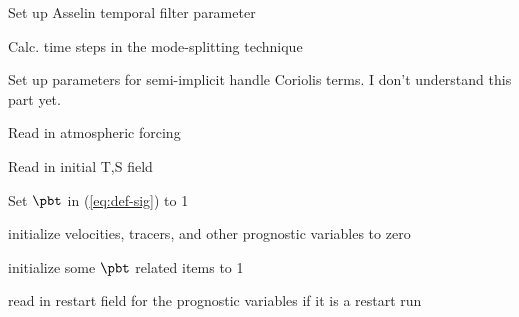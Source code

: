 \been

\item Set up Asselin temporal filter parameter
\item Calc. time steps in the mode-splitting technique
\item Set up parameters for semi-implicit handle Coriolis terms.
{\color{red} I don't understand this part yet}.
\item Read in atmospheric forcing
\item Read in initial T,S field
\item Set $\pbt$ in (\ref{eq:def-sig}) to 1
\item initialize  velocities, tracers, and other prognostic variables to zero
\item initialize some $\pbt$ related items to 1
\item read in restart field for the prognostic variables if it is a restart run
\enen
